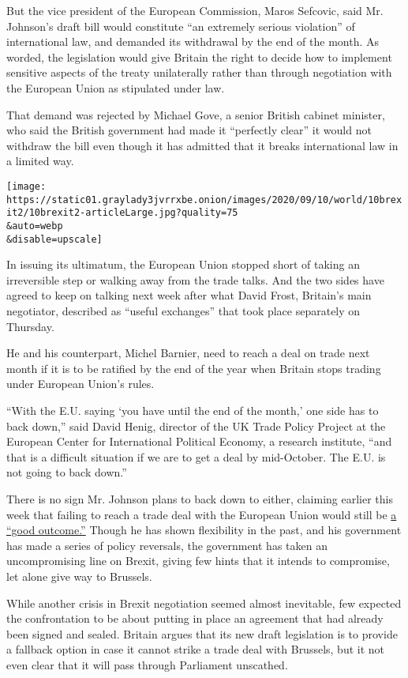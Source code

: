 But the vice president of the European Commission, Maros Sefcovic, said
Mr. Johnson's draft bill would constitute ``an extremely serious
violation'' of international law, and demanded its withdrawal by the end
of the month. As worded, the legislation would give Britain the right to
decide how to implement sensitive aspects of the treaty unilaterally
rather than through negotiation with the European Union as stipulated
under law.

That demand was rejected by Michael Gove, a senior British cabinet
minister, who said the British government had made it ``perfectly
clear'' it would not withdraw the bill even though it has admitted that
it breaks international law in a limited way.

\texttt{[image: https://static01.graylady3jvrrxbe.onion/images/2020/09/10/world/10brexit2/10brexit2-articleLarge.jpg?quality=75\\\&auto=webp\\\&disable=upscale]}

In issuing its ultimatum, the European Union stopped short of taking an
irreversible step or walking away from the trade talks. And the two
sides have agreed to keep on talking next week after what David Frost,
Britain's main negotiator, described as ``useful exchanges'' that took
place separately on Thursday.

He and his counterpart, Michel Barnier, need to reach a deal on trade
next month if it is to be ratified by the end of the year when Britain
stops trading under European Union's rules.

``With the E.U. saying `you have until the end of the month,' one side
has to back down,'' said David Henig, director of the UK Trade Policy
Project at the European Center for International Political Economy, a
research institute, ``and that is a difficult situation if we are to get
a deal by mid-October. The E.U. is not going to back down.''

There is no sign Mr. Johnson plans to back down to either, claiming
earlier this week that failing to reach a trade deal with the European
Union would still be
\href{https://www.nytimes3xbfgragh.onion/2020/09/08/world/europe/boris-johnson-brexit-northern-ireland.html}{a
``good outcome.''} Though he has shown flexibility in the past, and his
government has made a series of policy reversals, the government has
taken an uncompromising line on Brexit, giving few hints that it intends
to compromise, let alone give way to Brussels.

While another crisis in Brexit negotiation seemed almost inevitable, few
expected the confrontation to be about putting in place an agreement
that had already been signed and sealed. Britain argues that its new
draft legislation is to provide a fallback option in case it cannot
strike a trade deal with Brussels, but it not even clear that it will
pass through Parliament unscathed.

